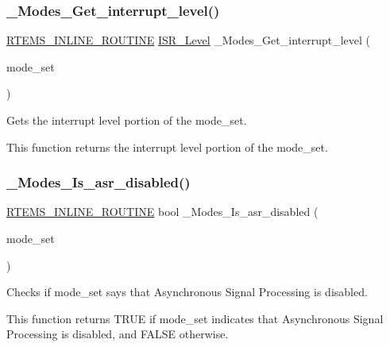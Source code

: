 \subsubsection{\texorpdfstring{\_Modes\_Get\_interrupt\_level()}{\_Modes\_Get\_interrupt\_level()}}
{\footnotesize\ttfamily \mbox{\hyperlink{group__RTEMSScoreBaseDefs_gac216239df231d5dbd15e3520b0b9313f}{R\+T\+E\+M\+S\+\_\+\+I\+N\+L\+I\+N\+E\+\_\+\+R\+O\+U\+T\+I\+NE}} \mbox{\hyperlink{group__RTEMSScoreISR_gad1af728587ebcefec5b5cf94fc7909b9}{I\+S\+R\+\_\+\+Level}} \+\_\+\+Modes\+\_\+\+Get\+\_\+interrupt\+\_\+level (\begin{DoxyParamCaption}\item[{\mbox{\hyperlink{group__ClassicModes_ga8d46a41a837840dc97336fdcd20e4f68}{rtems\+\_\+mode}}}]{mode\+\_\+set }\end{DoxyParamCaption})}



Gets the interrupt level portion of the mode\+\_\+set. 

This function returns the interrupt level portion of the mode\+\_\+set. \mbox{\label{group__ClassicModesImpl_ga34e4751d5be175830dae1780aa09776e}} 
\subsubsection{\texorpdfstring{\_Modes\_Is\_asr\_disabled()}{\_Modes\_Is\_asr\_disabled()}}
{\footnotesize\ttfamily \mbox{\hyperlink{group__RTEMSScoreBaseDefs_gac216239df231d5dbd15e3520b0b9313f}{R\+T\+E\+M\+S\+\_\+\+I\+N\+L\+I\+N\+E\+\_\+\+R\+O\+U\+T\+I\+NE}} bool \+\_\+\+Modes\+\_\+\+Is\+\_\+asr\+\_\+disabled (\begin{DoxyParamCaption}\item[{\mbox{\hyperlink{group__ClassicModes_ga8d46a41a837840dc97336fdcd20e4f68}{rtems\+\_\+mode}}}]{mode\+\_\+set }\end{DoxyParamCaption})}



Checks if mode\+\_\+set says that Asynchronous Signal Processing is disabled. 

This function returns T\+R\+UE if mode\+\_\+set indicates that Asynchronous Signal Processing is disabled, and F\+A\+L\+SE otherwise. \mbox{\label{group__ClassicModesImpl_ga7951761df7339bfa621b3c1bee188d15}} 
